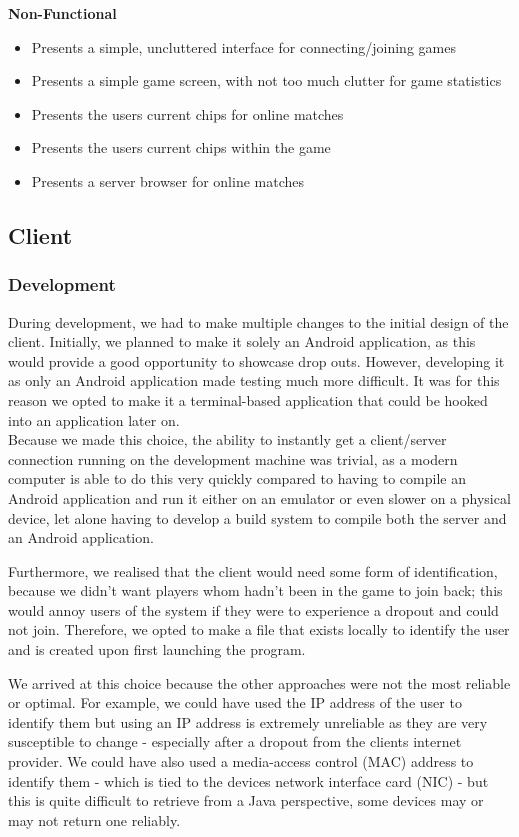 \documentclass[11pt]{article}
\begin{document}
\textbf{Non-Functional}
\begin{itemize}
	\item Presents a simple, uncluttered interface for connecting/joining games
	\item Presents a simple game screen, with not too much clutter for game statistics
	\item Presents the users current chips for online matches
	\item Presents the users current chips within the game
	\item Presents a server browser for online matches
\end{itemize}

\newpage



\subsection{Client}
\subsubsection{Development}

During development, we had to make multiple changes to the initial design of the client. Initially, we planned to make it solely an Android application, as this would provide a good opportunity to showcase drop outs. However, developing it as only an Android application made testing much more difficult. It was for this reason we opted to make it a terminal-based application that could be hooked into an application later on. \\

Because we made this choice, the ability to instantly get a client/server connection running on the development machine was trivial, as a modern computer is able to do this very quickly compared to having to compile an Android application and run it either on an emulator or even slower on a physical device, let alone having to develop a build system to compile both the server and an Android application.

Furthermore, we realised that the client would need some form of identification, because we didn't want players whom hadn't been in the game to join back; this would annoy users of the system if they were to experience a dropout and could not join. Therefore, we opted to make a file that exists locally to identify the user and is created upon first launching the program. 

We arrived at this choice because the other approaches were not the most reliable or optimal. For example, we could have used the IP address of the user to identify them but using an IP address is extremely unreliable as they are very susceptible to change - especially after a dropout from the clients internet provider. We could have also used a media-access control (MAC) address to identify them - which is tied to the devices network interface card (NIC) - but this is quite difficult to retrieve from a Java perspective, some devices may or may not return one reliably.
\end{document}
